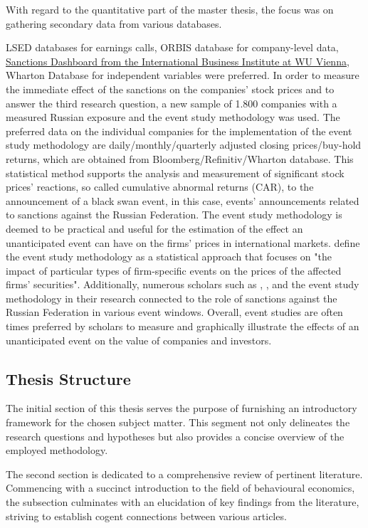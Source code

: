 \documentclass[12pt,a4paper]{article}
\begin{document}
With regard to the quantitative part of the master thesis, the focus was on gathering secondary data from various databases. 

LSED databases for earnings calls, ORBIS database for company-level data, \href{https://sanctions.ddns.net/}{Sanctions Dashboard from the International Business Institute at WU Vienna}, Wharton Database for independent variables were preferred. In order to measure the immediate effect of the sanctions on the companies' stock prices and to answer the third research question, a new sample of 1.800 companies with a measured Russian exposure and the event study methodology was used. The preferred data on the individual companies for the implementation of the event study methodology are daily/monthly/quarterly adjusted closing prices/buy-hold returns, which are obtained from Bloomberg/Refinitiv/Wharton database. This statistical method supports the analysis and measurement of significant stock prices' reactions, so called cumulative abnormal returns (CAR), to the announcement of a black swan event, in this case, events' announcements related to sanctions against the Russian Federation. The event study methodology is deemed to be practical and useful for the estimation of the effect an unanticipated event can have on the firms' prices in international markets. \cite{brown_using_1985} define the event study methodology as a statistical approach that focuses on "the impact of particular types of firm-specific events on the prices of the affected firms' securities". Additionally, numerous scholars such as \cite{abbassi_what_2022}, \cite{assaf_price_2023}, \cite{ghasseminejad_impact_2021} and \cite{kiesel_should_2023} the event study methodology in their research connected to the role of sanctions against the Russian Federation in various event windows. Overall, event studies are often times preferred by scholars to measure and graphically illustrate the effects of an unanticipated event on the value of companies and investors.


\subsection{Thesis Structure}
\label{subchap:intro_thesisstructure}
The initial section of this thesis serves the purpose of furnishing an introductory framework for the chosen subject matter. This segment not only delineates the research questions and hypotheses but also provides a concise overview of the employed methodology.

The second section is dedicated to a comprehensive review of pertinent literature. Commencing with a succinct introduction to the field of behavioural economics, the subsection culminates with an elucidation of key findings from the literature, striving to establish cogent connections between various articles.
\end{document}
